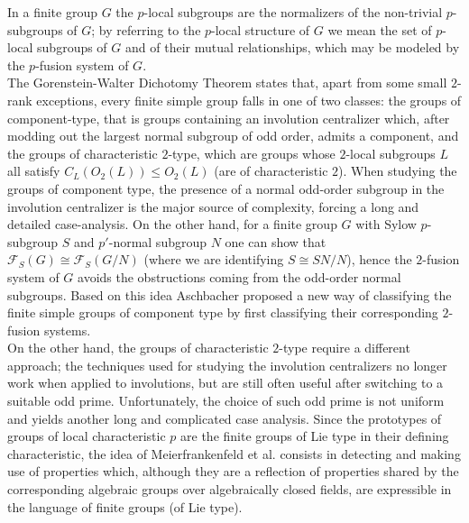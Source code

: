 \documentclass{amsart}
\numberwithin{equation}{section}
\theoremstyle{definition}
\theoremstyle{subresult}
\theoremstyle{caseresult}
\newcommand{\F}{\mathcal{F}}
\newcommand{\<}{\langle}
\renewcommand{\>}{\rangle}
\begin{document}
In a finite group $G$ the $p$-local subgroups are the normalizers of the non-trivial $p$-subgroups of $G$; by referring to the $p$-local structure of $G$ we mean the set of $p$-local subgroups of $G$ and of their mutual relationships, which may be modeled by the $p$-fusion system of $G$.\\
The Gorenstein-Walter Dichotomy Theorem states that, apart from some small $2$-rank exceptions, every finite simple group falls in one of two classes: the groups of component-type, that is groups containing an involution centralizer which, after modding out the largest normal subgroup of odd order, admits a component, and the groups of characteristic $2$-type, which are groups whose $2$-local subgroups $L$ all satisfy $C_L(O_2(L)) \le O_2(L)$ (are of characteristic $2$). When studying the groups of component type, the presence of a normal odd-order subgroup in the involution centralizer is the major source of complexity, forcing a long and detailed case-analysis. On the other hand, for a finite group $G$ with Sylow $p$-subgroup $S$ and $p'$-normal subgroup $N$ one can show that $\F_S(G) \cong \F_S(G/N)$ (where we are identifying $S \cong SN/N$), hence the $2$-fusion system of $G$ avoids the obstructions coming from the odd-order normal subgroups. Based on this idea Aschbacher proposed a new way of classifying the finite simple groups of component type by first classifying their corresponding $2$-fusion systems.\\
On the other hand, the groups of characteristic $2$-type require a different approach; the techniques used for studying the involution centralizers no longer work when applied to involutions, but are still often useful after switching to a suitable odd prime. Unfortunately, the choice of such odd prime is not uniform and yields another long and complicated case analysis. Since the prototypes of groups of local characteristic $p$ are the finite groups of Lie type in their defining characteristic, the idea of Meierfrankenfeld et al. consists in detecting and making use of properties which, although they are a reflection of properties shared by the corresponding algebraic groups over algebraically closed fields, are expressible in the language of finite groups (of Lie type).\\
\end{document}
